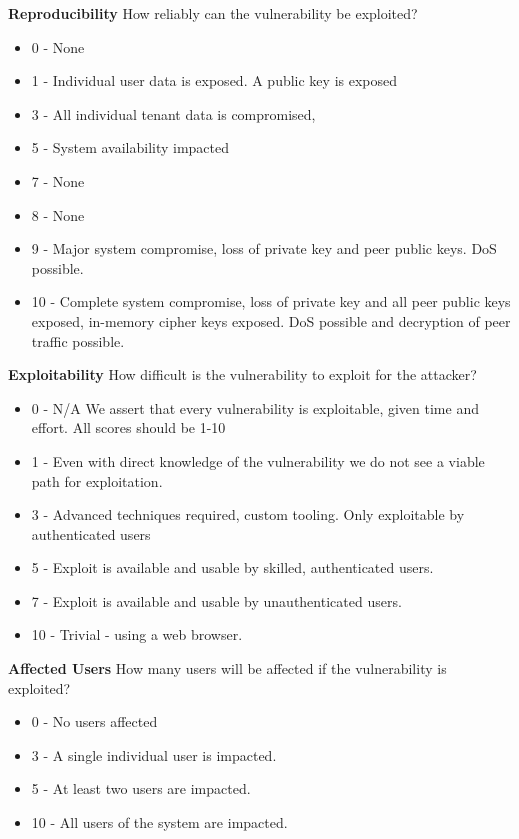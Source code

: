 \documentclass [11pt, proquest] {uwthesis}[2020/02/24]
\begin{document}
\begin{small}
\textbf{Reproducibility}
How reliably can the vulnerability be exploited?
\begin{itemize}
\label{dread:repro}
	\item 0 - None
    \item 1 - Individual user data is exposed. A public key is exposed
    \item 3 - All individual tenant data is compromised, 
    \item 5 - System availability impacted
    \item 7 - None
    \item 8 - None
    \item 9 - Major system compromise, loss of private key and peer public keys. DoS possible.
    \item 10 - Complete system compromise, loss of private key and all peer public keys exposed, in-memory cipher keys exposed. DoS possible and decryption of peer traffic possible.
\end{itemize}
\end{small}
\bigskip


\textbf{Exploitability}
How difficult is the vulnerability to exploit for the attacker?
\begin{small}
\begin{itemize}
\label{dread:exploitability}
	\item 0 - N/A We assert that every vulnerability is exploitable, given time and effort. All scores should be 1-10
    \item 1 - Even with direct knowledge of the vulnerability we do not see a viable path for exploitation.
    \item 3 -  Advanced techniques required, custom tooling. Only exploitable by authenticated users
    \item 5 - Exploit is available and usable by skilled, authenticated users.
    \item 7 - Exploit is available and usable by unauthenticated users.
    \item 10 - Trivial - using a web browser.
\end{itemize}
\end{small}
\bigskip

\textbf{Affected Users}
How many users will be affected if the vulnerability is exploited?
\begin{small}
\begin{itemize}
\label{dread:affectedusers}
	\item 0 - No users affected
    \item 3 - A single individual user is impacted.
    \item 5 - At least two users are impacted.
    \item 10 - All users of the system are impacted.
\end{itemize}
\end{small}
\bigskip
\end{document}
